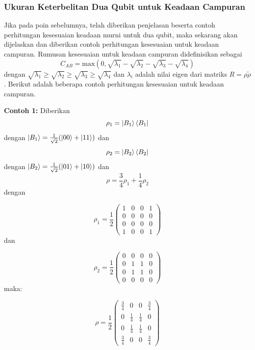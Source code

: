 \subsubsection{Ukuran Keterbelitan Dua Qubit untuk Keadaan Campuran}
Jika pada poin sebelumnya, telah diberikan penjelasan beserta contoh perhitungan kesesuaian keadaan murni untuk dua qubit, maka sekarang akan dijelaskan dan diberikan contoh perhitungan kesesuaian untuk keadaan campuran. Rumusan kesesuaian untuk keadaan campuran didefinisikan sebagai
\begin{equation*}
	C_{AB} = \text{max}(0, \sqrt{\lambda_1} - \sqrt{\lambda_2} - \sqrt{\lambda_3} - \sqrt{\lambda_4}) \label{konkurensi}
\end{equation*}
dengan $\sqrt{\lambda_1}\geq \sqrt{\lambda_2}\geq \sqrt{\lambda_3} \geq  \sqrt{\lambda_4}$ dan $\lambda_i$ adalah nilai eigen dari matriks $R = \rho \tilde{\rho}$. Berikut adalah beberapa contoh perhitungan kesesuaian untuk keadaan campuran.

\textbf{Contoh 1:} 
Diberikan 
\begin{equation}
	\rho_1 = \ket{B_1}\bra{B_1}
\end{equation}
dengan $\ket{B_1}=\frac{1}{\sqrt{2}}(\ket{00}+\ket{11})$ dan
\begin{equation}
	\rho_2 = \ket{B_2}\bra{B_2}
\end{equation}
dengan $\ket{B_2}=\frac{1}{\sqrt{2}}(\ket{01}+\ket{10})$ dan
\begin{equation}
	\rho = \frac{3}{4}\rho_1 + \frac{1}{4}\rho_2
\end{equation}
dengan

\begin{equation}
	\rho_1 = \frac{1}{2}
	\begin{pmatrix}
		1&0&0&1\\
		0&0&0&0\\
		0&0&0&0\\
		1&0&0&1
	\end{pmatrix}
\end{equation}
dan

\begin{equation}
	\rho_2 = \frac{1}{2}
	\begin{pmatrix}
		0&0&0&0\\
		0&1&1&0\\
		0&1&1&0\\
		0&0&0&0
	\end{pmatrix}
\end{equation}
maka:  

\begin{equation}
	\rho = \frac{1}{2}
	\begin{pmatrix}
		\frac{3}{4}&0&0&\frac{3}{4}\\
		0&\frac{1}{4}&\frac{1}{4}&0\\
		0&\frac{1}{4}&\frac{1}{4}&0\\
		\frac{3}{4}&0&0&\frac{3}{4}
	\end{pmatrix}
\end{equation}

